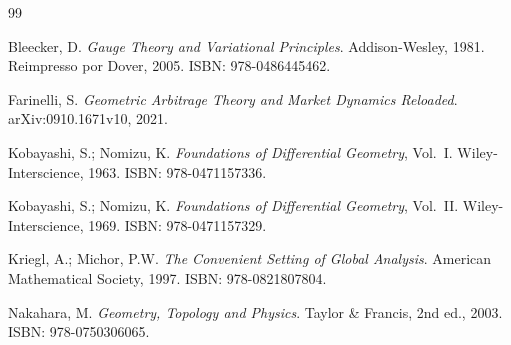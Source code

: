 \begin{thebibliography}{99}

Bleecker, D.
\textit{Gauge Theory and Variational Principles}.
Addison-Wesley, 1981. Reimpresso por Dover, 2005.
ISBN: 978-0486445462.

Farinelli, S.
\textit{Geometric Arbitrage Theory and Market Dynamics Reloaded}.
arXiv:0910.1671v10, 2021.

Kobayashi, S.; Nomizu, K.
\textit{Foundations of Differential Geometry}, Vol.~I.
Wiley-Interscience, 1963.
ISBN: 978-0471157336.

Kobayashi, S.; Nomizu, K.
\textit{Foundations of Differential Geometry}, Vol.~II.
Wiley-Interscience, 1969.
ISBN: 978-0471157329.

Kriegl, A.; Michor, P.W.
\textit{The Convenient Setting of Global Analysis}.
American Mathematical Society, 1997.
ISBN: 978-0821807804.

Nakahara, M.
\textit{Geometry, Topology and Physics}.
Taylor \& Francis, 2nd ed., 2003.
ISBN: 978-0750306065.

\end{thebibliography}



